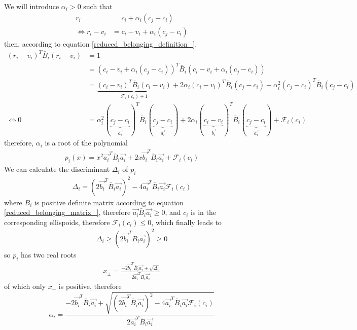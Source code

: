 \documentclass[class=report, float=false, crop=false]{standalone}
\begin{document}
We will introduce $\alpha_i > 0$ such that
\begin{align*}
r_i &= c_i + \alpha_i(c_j - c_i)\\
\Leftrightarrow r_i - v_i &= c_i - v_i + \alpha_i(c_j - c_i)
\end{align*}
then, according to equation \ref{reduced_belonging_definition_},
\begin{align*}
(r_i - v_i)^T\bar{B}_i(r_i - v_i) &= 1\\
&= (c_i - v_i + \alpha_i(c_j - c_i))^T\bar{B}_i(c_i - v_i + \alpha_i(c_j - c_i))\\
&= \underbrace{(c_i - v_i)^T\bar{B}_i(c_i - v_i)}_{\mathcal{F}_i(c_i) + 1} + 2 \alpha_i (c_i - v_i)^T\bar{B}_i(c_j - c_i) + \alpha_i^2(c_j - c_i)^T\bar{B}_i(c_j - c_i)\\
\Leftrightarrow 0 &= \alpha_i^2(\underbrace{c_j - c_i}_{\vec{a_i}})^T\bar{B}_i(\underbrace{c_j - c_i}_{\vec{a_i}}) + 2\alpha_i (\underbrace{c_i - v_i}_{\vec{b_i}})^T\bar{B}_i(\underbrace{c_j - c_i}_{\vec{a_i}}) + \mathcal{F}_i(c_i)
\end{align*}
therefore, $\alpha_i$ is a root of the polynomial
\begin{align*}
p_i(x) = x^2 \vec{a_i}^T\bar{B}_i\vec{a_i} + 2x \vec{b_i}^T\bar{B}_i\vec{a_i} + \mathcal{F}_i(c_i)
\end{align*}
We can calculate the discriminant $\Delta_i$ of $p_i$
\begin{align*}
\Delta_i = (2\vec{b_i}^T\bar{B}_i\vec{a_i})^2 - 4\vec{a_i}^T\bar{B}_i\vec{a_i}\mathcal{F}_i(c_i)
\end{align*}
where $\bar{B}_i$ is positive definite matrix according to equation \ref{reduced_belonging_matrix_}, therefore $\vec{a_i}\bar{B}_i\vec{a_i} \geq 0$, and $c_i$ is in the corresponding ellispoids, therefore $\mathcal{F}_i(c_i) \leq 0$, which finally leads to
\begin{align*}
\Delta_i \geq (2\vec{b_i}^T\bar{B}_i\vec{a_i})^2 \geq 0
\end{align*}
so $p_i$ has two real roots
\begin{align*}
x_{\pm} = \frac{-2\vec{b_i}^T\bar{B}_i\vec{a_i} \pm \sqrt{\Delta_i}}{2\vec{a_i}^T\bar{B}_i\vec{a_i}}
\end{align*}
of which only $x_+$ is positive, therefore
\begin{equation}
\boxed{\alpha_i = \frac{-2\vec{b_i}^T\bar{B}_i\vec{a_i} + \sqrt{(2\vec{b_i}^T\bar{B}_i\vec{a_i})^2 - 4\vec{a_i}^T\bar{B}_i\vec{a_i}\mathcal{F}_i(c_i)}}{2\vec{a_i}^T\bar{B}_i\vec{a_i}}}
\end{equation}
\end{document}
